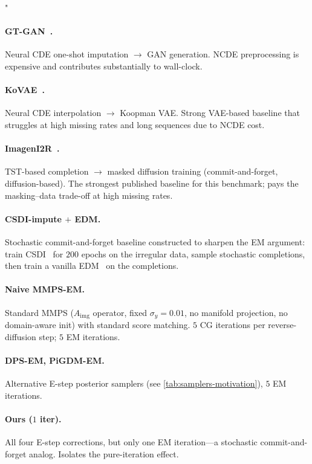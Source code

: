 "\documentclass{article}
\theoremstyle{plain}
\theoremstyle{definition}
\theoremstyle{remark}
\newcommand{\Aimg}{A_{\mathrm{img}}}
\begin{document}
\paragraph{GT-GAN~\citep{jeon2022gtgan}.}
Neural CDE one-shot imputation $\to$ GAN generation. NCDE preprocessing is expensive and contributes substantially to wall-clock.

\paragraph{KoVAE~\citep{naiman2024kovae}.}
Neural CDE interpolation $\to$ Koopman VAE. Strong VAE-based baseline that struggles at high missing rates and long sequences due to NCDE cost.

\paragraph{ImagenI2R~\citep{fadlon2025imageni2r}.}
TST-based completion $\to$ masked diffusion training (commit-and-forget, diffusion-based). The strongest published baseline for this benchmark; pays the masking--data trade-off at high missing rates.

\paragraph{CSDI-impute $+$ EDM.}
Stochastic commit-and-forget baseline constructed to sharpen the EM argument: train CSDI~\citep{tashiro2021csdi} for $200$ epochs on the irregular data, sample stochastic completions, then train a vanilla EDM~\citep{karras2022edm} on the completions.

\paragraph{Naive MMPS-EM.}
Standard MMPS ($\Aimg$ operator, fixed $\sigma_y = 0.01$, no manifold projection, no domain-aware init) with standard score matching. $5$ CG iterations per reverse-diffusion step; $5$ EM iterations.

\paragraph{DPS-EM, PiGDM-EM.}
Alternative E-step posterior samplers (see \cref{tab:samplers-motivation}), $5$ EM iterations.

\paragraph{Ours ($1$ iter).}
All four E-step corrections, but only one EM iteration---a stochastic commit-and-forget analog. Isolates the pure-iteration effect.
\end{document}
